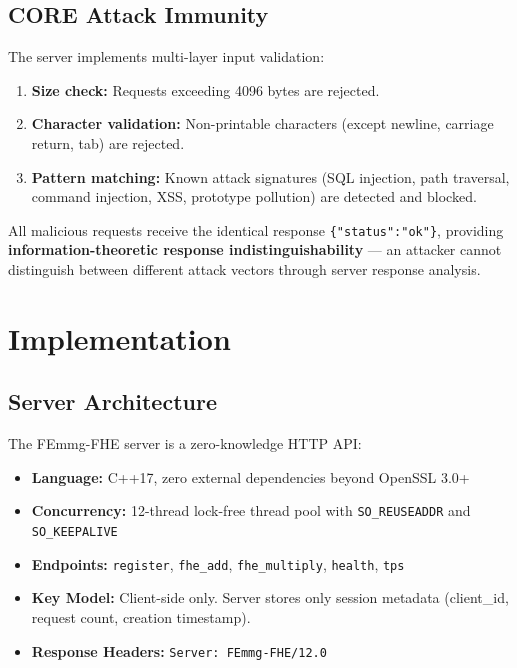 \documentclass{article}
\begin{document}
\subsection{CORE Attack Immunity}

The server implements multi-layer input validation:
\begin{enumerate}
    \item \textbf{Size check:} Requests exceeding 4096 bytes are rejected.
    \item \textbf{Character validation:} Non-printable characters (except newline, carriage return, tab) are rejected.
    \item \textbf{Pattern matching:} Known attack signatures (SQL injection, path traversal, command injection, XSS, prototype pollution) are detected and blocked.
\end{enumerate}

All malicious requests receive the identical response \texttt{\{"status":"ok"\}}, providing \textbf{information-theoretic response indistinguishability} --- an attacker cannot distinguish between different attack vectors through server response analysis.

\section{Implementation}

\subsection{Server Architecture}

The FEmmg-FHE server is a zero-knowledge HTTP API:
\begin{itemize}
    \item \textbf{Language:} C++17, zero external dependencies beyond OpenSSL 3.0+
    \item \textbf{Concurrency:} 12-thread lock-free thread pool with \texttt{SO\_REUSEADDR} and \texttt{SO\_KEEPALIVE}
    \item \textbf{Endpoints:} \texttt{register}, \texttt{fhe\_add}, \texttt{fhe\_multiply}, \texttt{health}, \texttt{tps}
    \item \textbf{Key Model:} Client-side only. Server stores only session metadata (client\_id, request count, creation timestamp).
    \item \textbf{Response Headers:} \texttt{Server: FEmmg-FHE/12.0}
\end{itemize}
\end{document}
